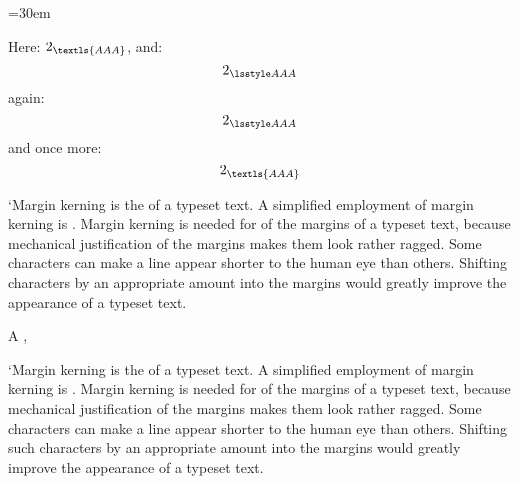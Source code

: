 



\setprotcode\font
\hsize=30em

Here: $2_{\textls{AAA}}$, and: $$2_{\lsstyle AAA}$$ again: $$2_{\lsstyle AAA}$$ and once more: $$2_{\textls{AAA}}$$

 `Margin kerning is the  of a
  typeset text. A simplified employment of margin kerning is . Margin kerning is needed for  of the margins
  of a typeset text, because mechanical justification of the margins makes
  them look rather ragged. Some characters can make a line appear shorter to
  the human eye than others. Shifting  characters by an appropriate
  amount into the margins would greatly improve the appearance of a typeset
  text.

A   ,

\vfill \eject

 `Margin kerning is the  of a
  typeset text. A simplified employment of margin kerning is . Margin kerning is needed for  of the margins
  of a typeset text, because mechanical justification of the margins makes
  them look rather ragged. Some characters can make a line appear shorter to
  the human eye than others. Shifting such characters by an appropriate
  amount into the margins would greatly improve the appearance of a typeset
  text.

\bye
